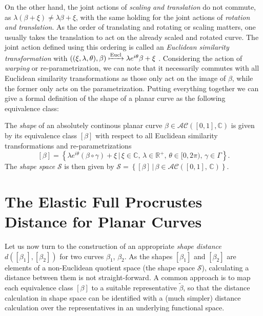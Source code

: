 On the other hand, the joint actions of \emph{scaling and translation} do not commute, as $\lambda(\beta + \xi) \neq \lambda\beta + \xi$, with the same holding for the joint actions of \emph{rotation and translation}.
As the order of translating and rotating or scaling  matters, one usually takes the translation to act on the already scaled and rotated curve.
The joint action defined using this ordering is called an \emph{Euclidean similarity transformation} with $\left((\xi, \lambda, \theta), \beta\right) \xmapsto{\text{Eucl}} \lambda e^{i\theta} \beta + \xi$ \parencite[see][62]{DrydenMardia2016}.
Considering the action of \emph{warping} or re-parametrization, we can note that it necessarily commutes with all Euclidean similarity transformations as those only act on the image of $\beta$, while the former only acts on the parametrization.
Putting everything together we can give a formal definition of the shape of a planar curve as the following equivalence class:
\begin{definition}[Shape]
  The \emph{shape} of an absolutely continous planar curve $\beta \in \mathcal{AC}([0,1], \mathbb{C})$ is given by its equivalence class $[\beta]$ with respect to all Euclidean similarity transformations and re-parametrizations
  $$ [\beta] = \left\{\lambda e^{i\theta}(\beta \circ \gamma) + \xi\,|\, \xi \in \mathbb{C},\, \lambda \in \mathbb{R}^+,\, \theta \in [0,2\pi),\, \gamma \in \Gamma\right\}. $$
  The \emph{shape space} $\mathcal{S}$ is then given by $\mathcal{S} = \left\{[\beta]\,|\,\beta \in \mathcal{AC}([0,1],\, \mathbb{C})\right\}$. 
\end{definition}


\section{The Elastic Full Procrustes Distance for Planar Curves}
\label{sec:2-dist}
Let us now turn to the construction of an appropriate \emph{shape distance} $d([\beta_1], [\beta_2])$ for two curves $\beta_1$, $\beta_2$.
As the shapes $[\beta_1]$ and $[\beta_2]$ are elements of a non-Euclidean quotient space (the shape space $\mathcal{S}$), calculating a distance between them is not straight-forward.
A common approach is to map each equivalence class $[\beta]$ to a suitable representative $\widetilde \beta$, so that the distance calculation in shape space can be identified with a (much simpler) distance calculation over the representatives in an underlying functional space.

